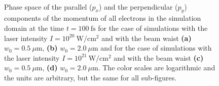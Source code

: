 \begin{figure}[h!]
	\centering
	\\
	\caption{Phase space of the parallel ($ p_x $) and the perpendicular ($ p_y $) components of the momentum of all electrons in the simulation domain at the time $ t = 100 \ \mathrm{fs} $ for the case of simulations with the laser intensity $ I = 10^{20} \ \mathrm{W/cm^2} $ and with the beam waist \textbf{(a)} $ w_0 = 0.5 \ \mu\mathrm{m} $, \textbf{(b)} $ w_0 = 2.0 \ \mu\mathrm{m} $ and for the case of simulations with the laser intensity $ I = 10^{21} \ \mathrm{W/cm^2} $ and with the beam waist \textbf{(c)} $ w_0 = 0.5 \ \mu\mathrm{m} $, \textbf{(d)} $ w_0 = 2.0 \ \mu\mathrm{m} $. The color scales are logarithmic and the units are arbitrary, but the same for all sub-figures.}
	\label{fig:12}
\end{figure}

